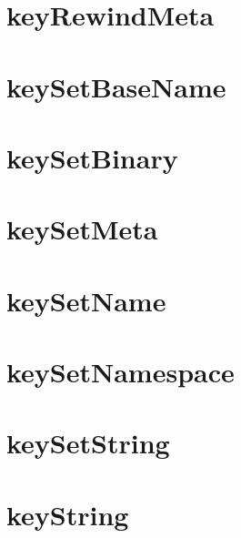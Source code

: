 \let\mypdfximage\pdfximage\def\pdfximage{\immediate\mypdfximage}\documentclass[twoside]{book}
\newcommand{\+}{\discretionary{\mbox{\scriptsize$\hookleftarrow$}}{}{}}
\begin{document}
\chapter{key\+Rewind\+Meta}
\label{doc_contrib_api_reviews_core_keyRewindMeta_md}

\chapter{key\+Set\+Base\+Name}
\label{doc_contrib_api_reviews_core_keySetBaseName_md}

\chapter{key\+Set\+Binary}
\label{doc_contrib_api_reviews_core_keySetBinary_md}

\chapter{key\+Set\+Meta}
\label{doc_contrib_api_reviews_core_keySetMeta_md}

\chapter{key\+Set\+Name}
\label{doc_contrib_api_reviews_core_keySetName_md}

\chapter{key\+Set\+Namespace}
\label{doc_contrib_api_reviews_core_keySetNamespace_md}

\chapter{key\+Set\+String}
\label{doc_contrib_api_reviews_core_keySetString_md}

\chapter{key\+String}
\label{doc_contrib_api_reviews_core_keyString_md}

\end{document}
